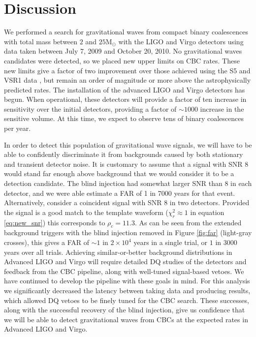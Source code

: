 \documentclass[prd,superscriptaddress,showpacs,amssymb,amsmath,amsfonts,aps,altaffilletter,nofootinbib,letterpaper,twocolumn]{revtex4}
\def\Msun{\ensuremath{\mathrm{M_{\odot}}}}
\def\sfivelvc{S5LowMassLV}
\begin{document}
\section{Discussion}
\label{sec:discussion}


We performed a search for gravitational waves from compact binary
coalescences with total mass between $2$ and $25\Msun$ with the
\ac{LIGO} and Virgo detectors using data taken between July 7, 2009 and
October 20, 2010.  No gravitational waves candidates were detected, so
we placed new upper limits on \ac{CBC} rates.  These new limits give a
factor of two improvement over those achieved using the
\ac{S5} and \ac{VSR1} data \cite{\sfivelvc}, but remain an order of
magnitude or more above the astrophysically predicted rates.  The
installation of the advanced \ac{LIGO} and Virgo detectors has begun.
When operational, these detectors will provide a factor of ten increase
in sensitivity over the initial detectors, providing a factor of
$\sim1000$ increase in the sensitive volume.  At this time, we expect to
observe tens of binary coalescences per year. \cite{ratesdoc}

In order to detect this population of gravitational wave signals, we
will have to be able to confidently discriminate it from backgrounds
caused by both stationary and transient detector noise.  It is customary
\cite{ratesdoc} to assume that a signal with \ac{SNR} 8 would stand far
enough above background that we would consider it to be a detection
candidate.  The blind injection had somewhat larger \ac{SNR} than 8 in
each detector, and we were able estimate a \ac{FAR} of 1 in 7000 years
for that event.  Alternatively, consider a coincident signal with
\ac{SNR} 8 in two detectors.  Provided the signal is a good match to the
template waveform ($\chi^{2}_{r} \approx 1$ in equation
\ref{eq:new_snr}) this corresponds to $\rho_c = 11.3$. As can be seen
from the extended background triggers with the blind injection removed
in Figure \ref{fig:far} (light-gray crosses), this gives a \ac{FAR} of
$\sim 1$ in $2 \times 10^{4}$ years in a single trial, or $1$ in 3000
years over all trials.  Achieving similar-or-better background
distributions in Advanced LIGO and Virgo will require detailed \ac{DQ}
studies of the detectors and feedback from the \ac{CBC} pipeline, along
with well-tuned signal-based vetoes. We have continued to develop the
pipeline with these goals in mind. For this analysis we significantly
decreased the latency between taking data and producing results, which
allowed \ac{DQ} vetoes to be finely tuned for the \ac{CBC} search. These
successes, along with the successful recovery of the blind injection,
give us confidence that we will be able to detect gravitational waves
from \ac{CBC}s at the expected rates in Advanced LIGO and Virgo.



\end{document}
